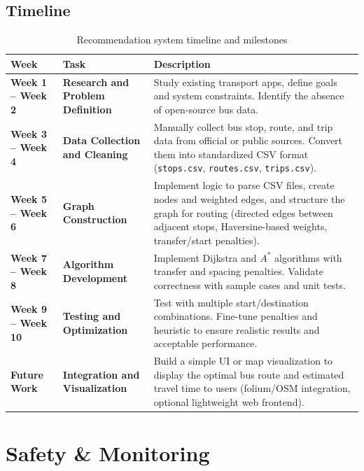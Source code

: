 \subsection{Timeline}
\begin{table}[H]
  \centering
  \renewcommand{\arraystretch}{1.15}
  \begin{tabularx}{\textwidth}{|>{\raggedright\arraybackslash}p{3.2cm}|>{\raggedright\arraybackslash}p{3.2cm}|>{\raggedright\arraybackslash}X|}
    \hline
    	\textbf{Week} & \textbf{Task} & \textbf{Description} \\
    \hline
    	\textbf{Week 1 -- Week 2} & \textbf{Research and Problem Definition} & Study existing transport apps, define goals and system constraints. Identify the absence of open-source bus data. \\
    \hline
    	\textbf{Week 3 -- Week 4} & \textbf{Data Collection and Cleaning} & Manually collect bus stop, route, and trip data from official or public sources. Convert them into standardized CSV format (\texttt{stops.csv}, \texttt{routes.csv}, \texttt{trips.csv}). \\
    \hline
    	\textbf{Week 5 -- Week 6} & \textbf{Graph Construction} & Implement logic to parse CSV files, create nodes and weighted edges, and structure the graph for routing (directed edges between adjacent stops, Haversine-based weights, transfer/start penalties). \\
    \hline
      \textbf{Week 7 -- Week 8} & \textbf{Algorithm Development} & Implement Dijkstra and $A^*$ algorithms with transfer and spacing penalties. Validate correctness with sample cases and unit tests. \\
    \hline
    	\textbf{Week 9 -- Week 10} & \textbf{Testing and Optimization} & Test with multiple start/destination combinations. Fine-tune penalties and heuristic to ensure realistic results and acceptable performance. \\
    \hline
    	\textbf{Future Work} & \textbf{Integration and Visualization} & Build a simple UI or map visualization to display the optimal bus route and estimated travel time to users (folium/OSM integration, optional lightweight web frontend). \\
    \hline
  \end{tabularx}
  \caption{Recommendation system timeline and milestones}\label{tab:reco-timeline}
\end{table}

\section{Safety \& Monitoring}
